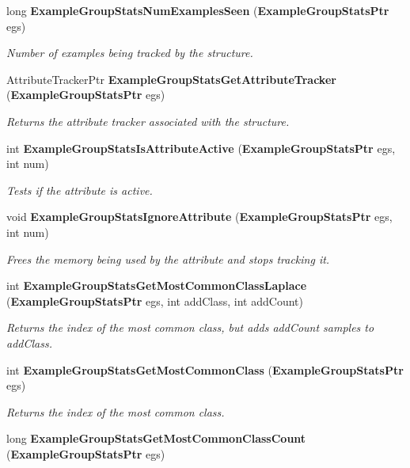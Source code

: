 \begin{CompactItemize}
long {\bf Example\-Group\-Stats\-Num\-Examples\-Seen} ({\bf Example\-Group\-Stats\-Ptr} egs)
\begin{CompactList}\small\item\em Number of examples being tracked by the structure. \item\end{CompactList}\item 
Attribute\-Tracker\-Ptr {\bf Example\-Group\-Stats\-Get\-Attribute\-Tracker} ({\bf Example\-Group\-Stats\-Ptr} egs)
\begin{CompactList}\small\item\em Returns the attribute tracker associated with the structure. \item\end{CompactList}\item 
int {\bf Example\-Group\-Stats\-Is\-Attribute\-Active} ({\bf Example\-Group\-Stats\-Ptr} egs, int num)
\begin{CompactList}\small\item\em Tests if the attribute is active. \item\end{CompactList}\item 
void {\bf Example\-Group\-Stats\-Ignore\-Attribute} ({\bf Example\-Group\-Stats\-Ptr} egs, int num)
\begin{CompactList}\small\item\em Frees the memory being used by the attribute and stops tracking it. \item\end{CompactList}\item 
int {\bf Example\-Group\-Stats\-Get\-Most\-Common\-Class\-Laplace} ({\bf Example\-Group\-Stats\-Ptr} egs, int add\-Class, int add\-Count)
\begin{CompactList}\small\item\em Returns the index of the most common class, but adds add\-Count samples to add\-Class. \item\end{CompactList}\item 
int {\bf Example\-Group\-Stats\-Get\-Most\-Common\-Class} ({\bf Example\-Group\-Stats\-Ptr} egs)
\begin{CompactList}\small\item\em Returns the index of the most common class. \item\end{CompactList}\item 
long {\bf Example\-Group\-Stats\-Get\-Most\-Common\-Class\-Count} ({\bf Example\-Group\-Stats\-Ptr} egs)

\end{CompactItemize}
